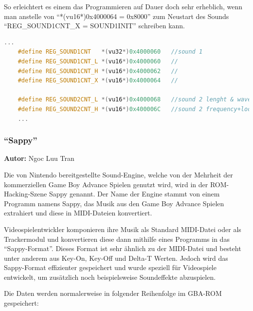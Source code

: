 \documentclass[11pt,a4paper]{scrartcl}
\newcommand{\AutorNgoc} {
    \vspace{-4mm}
    \large \textbf{Autor:} Ngoc Luu Tran \normalsize
    \vspace{2mm}
}
\begin{document}
So erleichtert es einem das Programmieren auf Dauer doch sehr erheblich, wenn man anstelle von \enquote{*(vu16*)0x4000064 = 0x8000} zum Neustart des Sounds \enquote{REG\_SOUND1CNT\_X = SOUND1INIT} schreiben kann.
\newpage
\vspace{5mm}
\begin{lstlisting}[language=C++, caption={2. Ausschnitt aus Belogic gba.h}, label={list:gbaheader1}]
    ...
	#define REG_SOUND1CNT   *(vu32*)0x4000060	//sound 1
	#define REG_SOUND1CNT_L *(vu16*)0x4000060	//
	#define REG_SOUND1CNT_H *(vu16*)0x4000062	//
	#define REG_SOUND1CNT_X *(vu16*)0x4000064	//

	#define REG_SOUND2CNT_L *(vu16*)0x4000068	//sound 2 lenght & wave duty
	#define REG_SOUND2CNT_H *(vu16*)0x400006C	//sound 2 frequency+loop+reset
	...
\end{lstlisting}


\subsubsection{\enquote{Sappy}}
\AutorNgoc

Die von Nintendo bereitgestellte Sound-Engine, welche von der Mehrheit der kommerziellen Game Boy Advance Spielen genutzt wird, wird in der ROM-Hacking-Szene Sappy genannt. 
Der Name der Engine stammt von einem Programm namens Sappy, das Musik aus den Game Boy Advance Spielen extrahiert und diese in MIDI-Dateien konvertiert.


Videospielentwickler komponieren ihre Musik als Standard MIDI-Datei oder als Trackermodul und konvertieren diese dann mithilfe eines Programms in das \enquote{Sappy-Format}. Dieses Format ist sehr \"ahnlich zu der MIDI-Datei und besteht unter anderem aus Key-On, Key-Off und Delta-T Werten. Jedoch wird das Sappy-Format effizienter gespeichert und wurde speziell f\"ur Videospiele entwickelt, um zus\"atzlich noch beispielsweise Soundeffekte abzuspielen.

Die Daten werden normalerweise in folgender Reihenfolge im GBA-ROM gespeichert:
\end{document}
